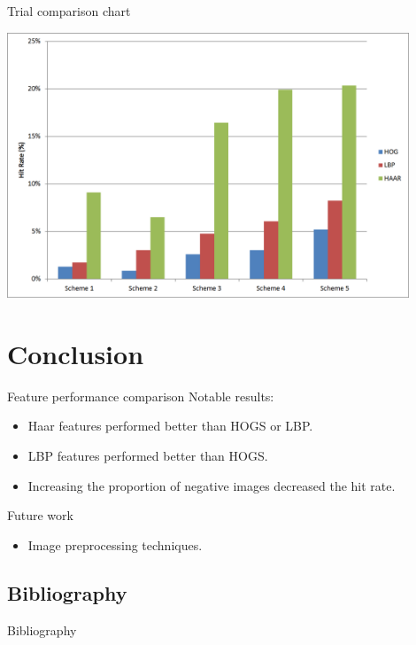 \documentclass{beamer}
\begin{document}
\begin{frame}{Trial comparison chart}
	\begin{center}
		\includegraphics[width=0.9\textwidth]{results_graph}
	\end{center}
\end{frame}

\section{Conclusion}

\begin{frame}{Feature performance comparison}
	Notable results: \par
	\begin{itemize}
		\item Haar features performed better than HOGS or LBP.
		\item LBP features performed better than HOGS.
		\item Increasing the proportion of negative images decreased the hit rate.
	\end{itemize}
\end{frame}

\begin{frame}{Future work}
	\begin{itemize}
		\item Image preprocessing techniques.
	\end{itemize}
\end{frame}

\subsection{Bibliography}

\begin{frame}{Bibliography}
	\footnotesize
	
	
\end{frame}
\end{document}
